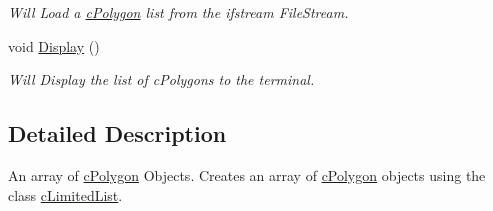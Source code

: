 \begin{DoxyCompactItemize}
\begin{DoxyCompactList}\small\item\em Will Load a \hyperlink{classc_polygon}{cPolygon} list from the ifstream FileStream. \end{DoxyCompactList}\item 
\hypertarget{classc_polygon_list_a5ce346e9acdb586e230c30845b27888a}{
void \hyperlink{classc_polygon_list_a5ce346e9acdb586e230c30845b27888a}{Display} ()}
\label{classc_polygon_list_a5ce346e9acdb586e230c30845b27888a}

\begin{DoxyCompactList}\small\item\em Will Display the list of cPolygons to the terminal. \end{DoxyCompactList}\end{DoxyCompactItemize}


\subsection{Detailed Description}
An array of \hyperlink{classc_polygon}{cPolygon} Objects. Creates an array of \hyperlink{classc_polygon}{cPolygon} objects using the class \hyperlink{classc_limited_list}{cLimitedList}. 
